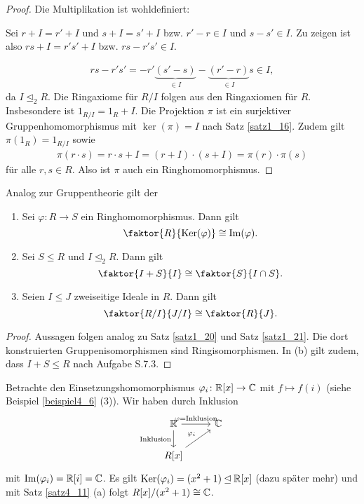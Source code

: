 \begin{proof}
	Die Multiplikation ist wohldefiniert:
	
	Sei $r + I = r' + I$ und $s+I = s'+I$ bzw. $r' - r \in I$ und $s - s' \in I$. Zu zeigen ist also $rs + I = r's' + I$ bzw. $rs - r's' \in I$.
	
	\begin{align*}
		rs - r's' = -r'\underbrace{(s' - s)}_{\in I} - \underbrace{(r' - r)}_{\in I} s \in I,
	\end{align*}
	da $I \unlhd_2 R$. Die Ringaxiome für $R/I$ folgen aus den Ringaxiomen für $R$. Insbesondere ist $1_{R/I} = 1_R + I$. Die Projektion $\pi$ ist ein surjektiver Gruppenhomomorphismus mit  $\ker(\pi) = I$ nach Satz \ref{satz1_16}. Zudem gilt $\pi(1_R) = 1_{R/I}$ sowie
	\begin{align*}
		\pi(r\cdot s) = r \cdot s + I = (r+I)\cdot(s + I) = \pi(r) \cdot \pi(s)
	\end{align*}
	für alle $r,s \in R$. Also ist $\pi$ auch ein Ringhomomorphismus.
\end{proof}
Analog zur Gruppentheorie gilt der
\begin{satz}\label{satz4_11}
	\begin{enumerate}[label=(\alph*)]
		\item Sei $\varphi \colon R \to S$ ein Ringhomomorphismus. Dann gilt
		\[\faktor{R}{\ker(\varphi)} \cong \im(\varphi).\]
		\item Sei $S \leq R$ und $I \unlhd_2 R$. Dann gilt
		\[\faktor{I+S}{I} \cong \faktor{S}{I \cap S}.\]
		\item Seien $I \leq J$ zweiseitige Ideale in $R$. Dann gilt
		\[\faktor{R/I}{J/I} \cong \faktor{R}{J}.\]
	\end{enumerate}
\end{satz}
\begin{proof}
	Aussagen folgen analog zu Satz \ref{satz1_20} und Satz \ref{satz1_21}. Die dort konstruierten Gruppenisomorphismen sind Ringisomorphismen. In (b) gilt zudem, dass $I+S \leq R$ nach Aufgabe S.7.3.
\end{proof}
\begin{beispiel}\label{beispiel4_12}
	Betrachte den Einsetzungshomomorphismus $\varphi_i \colon \mathbb{R}[x] \to \mathbb{C}$ mit $f \mapsto f(i)$ (siehe Beispiel \ref{beispiel4_6} (3)). Wir haben durch Inklusion
	\[
	\begin{tikzcd}
		\R \arrow{r}{\varphi = \text{Inklusion}} \arrow[swap]{d}{\text{Inklusion}} & \C\\
		R[x] \arrow{ur}{\varphi_i} 
	\end{tikzcd}
	\]
	mit $\mathrm{Im}(\varphi_i) = \mathbb{R}[i] = \mathbb{C}$. Es gilt $\mathrm{Ker}(\varphi_i) = (x^2 + 1) \unlhd \mathbb{R}[x]$ (dazu später mehr) und mit Satz \ref{satz4_11} (a) folgt $R[x] /(x^2 + 1) \cong \mathbb{C}$.
\end{beispiel}

